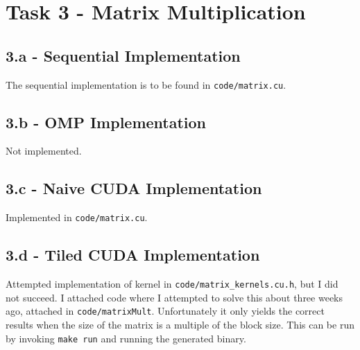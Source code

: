 \documentclass[11pt,a4paper,english]{article}
\begin{document}
\section*{Task 3 - Matrix Multiplication}
\subsection*{3.a - Sequential Implementation}
The sequential implementation is to be found in \texttt{code/matrix.cu}.


\subsection*{3.b - OMP Implementation}
Not implemented.

\subsection*{3.c - Naive CUDA Implementation}
Implemented in \texttt{code/matrix.cu}.

\subsection*{3.d - Tiled CUDA Implementation}
Attempted implementation of kernel in \texttt{code/matrix\_kernels.cu.h}, but I did not succeed. I attached code where I attempted to solve this about three weeks ago, attached in \texttt{code/matrixMult}. Unfortunately it only yields the correct results when the size of the matrix is a multiple of the block size. This can be run by invoking \texttt{make run} and running the generated binary.



%
%



\end{document}
